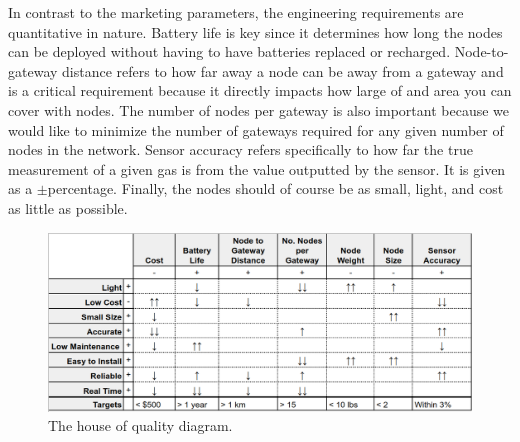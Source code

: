 In contrast to the marketing parameters, the engineering requirements are quantitative in nature. Battery life is key since it determines how long the nodes can be deployed without having to have batteries replaced or recharged. Node-to-gateway distance refers to how far away a node can be away from a gateway and is a critical requirement because it directly impacts how large of and area you can cover with nodes. The number of nodes per gateway is also important because we would like to minimize the number of gateways required for any given number of nodes in the network. Sensor accuracy refers specifically to how far the true measurement of a given gas is from the value outputted by the sensor. It is given as a $\pm$percentage. Finally, the nodes should of course be as small, light, and cost as little as possible.
\begin{figure}[tbh]
    \centering
    \includegraphics[width=6.25in]{./figures/hoq.png} 
    \caption{The house of quality diagram.}
    \label{fig:hoq}
\end{figure}


